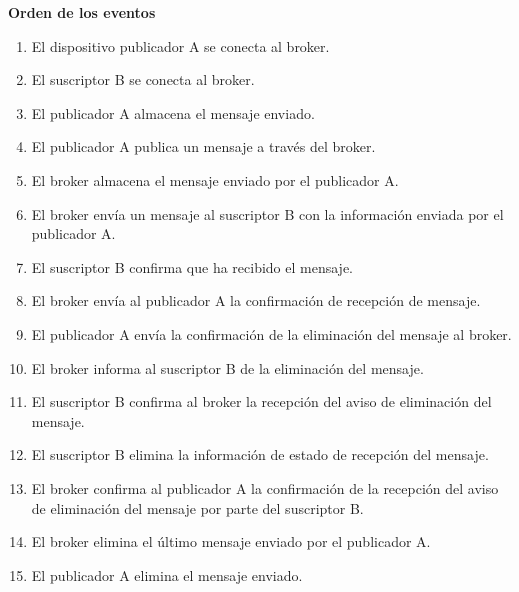 \documentclass[12pt, twoside, openright]{report} %
\begin{document}
\begin{description}
	      \textbf{Orden de los eventos}
	      \begin{enumerate}
		      \item El dispositivo publicador A se conecta al broker.
		      \item El suscriptor B se conecta al broker.
		      \item El publicador A almacena el mensaje enviado.
		      \item El publicador A publica un mensaje a través del broker.
		      \item El broker almacena el mensaje enviado por el publicador A.
		      \item El broker envía un mensaje al suscriptor B con la información enviada por el publicador A.
		      \item El suscriptor B confirma que ha recibido el mensaje.
		      \item El broker envía al publicador A la confirmación de recepción de mensaje.
		      \item El publicador A envía la confirmación de la eliminación del mensaje al broker.
		      \item El broker informa al suscriptor B de la eliminación del mensaje.
		      \item El suscriptor B confirma al broker la recepción del aviso de eliminación del mensaje.
		      \item El suscriptor B elimina la información de estado de recepción del mensaje.
		      \item El broker confirma al publicador A la confirmación de la recepción del aviso de eliminación del mensaje por parte del suscriptor B.
		      \item El broker elimina el último mensaje enviado por el publicador A.
		      \item El publicador A elimina el mensaje enviado.
	      \end{enumerate}


\end{description}
\end{document}
